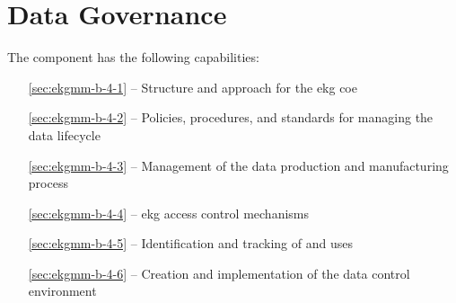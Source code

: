 \chapter{Data Governance}\label{ch:ekgmm-b-4} %

The  component has the following capabilities:

\begin{itemize}[leftmargin=.5in]
  \item [\ref{sec:ekgmm-b-4-1}]  -- Structure and approach for the \gls{ekg} \gls{coe}
  \item [\ref{sec:ekgmm-b-4-2}]  -- Policies, procedures, and standards for managing the data lifecycle
  \item [\ref{sec:ekgmm-b-4-3}]  -- Management of the data production and manufacturing process 
  \item [\ref{sec:ekgmm-b-4-4}]  -- \gls{ekg} access control mechanisms
  \item [\ref{sec:ekgmm-b-4-5}]  -- Identification and tracking of  and uses
  \item [\ref{sec:ekgmm-b-4-6}]  -- Creation and implementation of the data control environment
\end{itemize}








